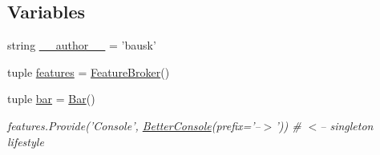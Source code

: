 \subsection*{Variables}
\begin{DoxyCompactItemize}
\item 
string \hyperlink{namespace_py_inversion_a75d60c831488f0073dfa93077eeb6645}{\+\_\+\+\_\+author\+\_\+\+\_\+} = 'bausk'
\item 
tuple \hyperlink{namespace_py_inversion_a83916a9bd83dabb820f9756e0d6e9bc5}{features} = \hyperlink{class_py_inversion_1_1_feature_broker}{Feature\+Broker}()
\item 
tuple \hyperlink{namespace_py_inversion_a2744d30b0d1932d2fc87d21291bb5a1a}{bar} = \hyperlink{class_py_inversion_1_1_bar}{Bar}()
\begin{DoxyCompactList}\small\item\em features.\+Provide('Console', \hyperlink{class_py_inversion_1_1_better_console}{Better\+Console}(prefix='--$>$')) \# $<$-- singleton lifestyle \end{DoxyCompactList}\end{DoxyCompactItemize}


